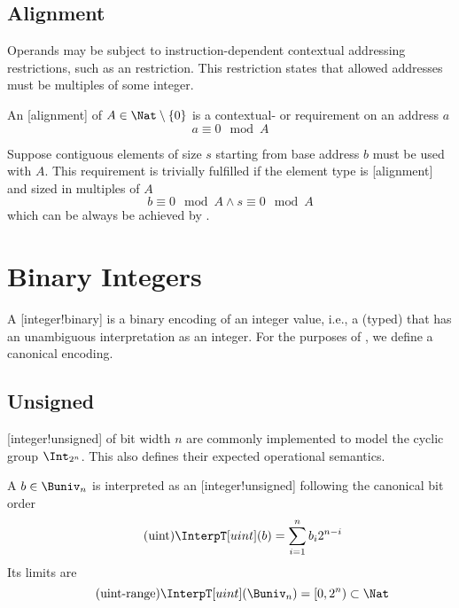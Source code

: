 \subsection{Alignment}

Operands may be subject to instruction-dependent contextual addressing restrictions, such as an  restriction.
This restriction states that allowed addresses must be multiples of some integer.

\begin{definition}[Alignment]
    An [alignment] of \(A \in \Nat\setminus\{0\}\) is a contextual- or  requirement on an  address \(a\)
    \begin{equation*}
        a \equiv 0 \mod A
    \end{equation*}
\end{definition}

Suppose contiguous elements of size \(s\) starting from base address \(b\) must be used with  \(A\).
This requirement is trivially fulfilled if the element type is [alignment] and sized in multiples of \(A\)
\begin{equation*}
    b \equiv 0 \mod A \land s \equiv 0 \mod A
\end{equation*}
which can be always be achieved by .

\section{Binary Integers}

A [integer!binary] is a binary encoding of an integer value, i.e., a (typed)  that has an unambiguous interpretation as an integer.
For the purposes of \basetwo, we define a canonical encoding.

\subsection{Unsigned}

[integer!unsigned] of bit width \(n\) are commonly implemented to model the cyclic group \(\Int_{2^n}\).
This also defines their expected operational semantics.

\begin{definition}
    A  \(b \in \Buniv_n\) is interpreted as an [integer!unsigned] following the canonical bit order
    \begin{equation}
        \label{eq:uint}
        \tag{uint}
        \InterpT[uint](b) = \sum_{i = 1}^{n} b_i 2^{n-i}
    \end{equation}
    Its limits are
    \begin{equation}
        \label{eq:uint_range}
        \tag{uint-range}
        \InterpT[uint](\Buniv_n) = [0, 2^n) \subset \Nat
    \end{equation}
\end{definition}

